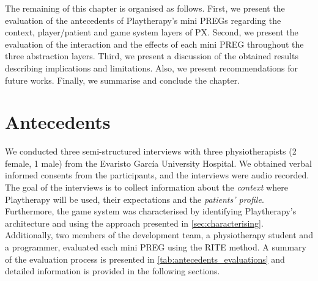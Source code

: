 The remaining of this chapter is organised as follows. First, we present the evaluation of the antecedents of Playtherapy's mini \acp{PREG} regarding the context, player/patient and game system layers of \ac{PX}. Second, we present the evaluation of the interaction and the effects of each mini \ac{PREG} throughout the three abstraction layers. Third, we present a discussion of the obtained results describing implications and limitations. Also, we present recommendations for future works. Finally, we summarise and conclude the chapter.

\section{Antecedents}
We conducted three semi-structured interviews with three physiotherapists (2 female, 1 male) from the Evaristo Garc\'ia University Hospital. We obtained verbal informed consents from the participants, and the interviews were audio recorded. The goal of the interviews is to collect information about the \emph{context} where Playtherapy will be used, their expectations and the \emph{patients' profile}. Furthermore, the game system was characterised by identifying Playtherapy's architecture and using the approach presented in \autoref{sec:characterising}. Additionally, two members of the development team, a physiotherapy student and a programmer, evaluated each mini \ac{PREG} using the \ac{RITE} method. A summary of the evaluation process is presented in \autoref{tab:antecedents_evaluations} and detailed information is provided in the following sections.


